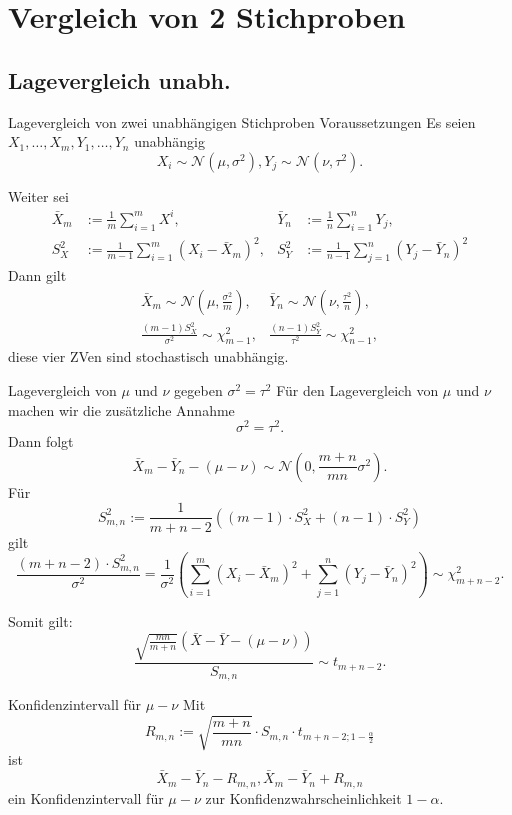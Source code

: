 \section{Vergleich von 2 Stichproben}

\subsection{Lagevergleich unabh.}

\begin{karte}{Lagevergleich von zwei unabhängigen Stichproben Voraussetzungen}
Es seien \( X_1, \ldots, X_m, Y_1, \ldots, Y_n \) unabhängig
\[ X_i \sim \mathcal{N}(\mu, \sigma^2), Y_j \sim \mathcal{N}(\nu, \tau^2). \]

Weiter sei 
\begin{align*}
\bar{X}_m &:= \frac{1}{m} \sum_{i=1}^m X^i, &\bar{Y}_n &:= \frac{1}{n} \sum_{i=1}^n Y_j, \\
S_X^2 &:= \frac{1}{m-1} \sum_{i=1}^m (X_i - \bar{X}_m)^2, &S_Y^2 &:= \frac{1}{n-1} \sum_{j=1}^n (Y_j - \bar{Y}_n)^2
\end{align*}
Dann gilt 
\begin{align*}
    \bar{X}_m \sim \mathcal{N}(\mu, \frac{\sigma^2}{m}), &\bar{Y}_n \sim \mathcal{N}(\nu, \frac{\tau^2}{n}), \\
    \frac{(m-1)S_X^2}{\sigma^2} \sim \chi_{m-1}^2, & \frac{(n-1)S_Y^2}{\tau^2} \sim \chi_{n-1}^2,
\end{align*}
diese vier ZVen sind stochastisch unabhängig.
\end{karte}

\begin{karte}{Lagevergleich von \(\mu\) und \(\nu\) gegeben \(\sigma^2 = \tau^2\)}
Für den Lagevergleich von \( \mu \) und \(\nu\) machen wir die zusätzliche Annahme 
\[ \sigma^2 = \tau^2. \]
Dann folgt 
\[ \bar{X}_m - \bar{Y}_n - (\mu - \nu) \sim \mathcal{N}(0, \frac{m+n}{mn} \sigma^2). \]
Für 
\[ S_{m,n}^2 := \frac{1}{m+n-2} ((m-1)\cdot S_X^2 + (n-1) \cdot S_Y^2) \]
gilt 
\[ \frac{(m+n-2) \cdot S_{m,n}^2}{\sigma^2} = \frac{1}{\sigma^2} \left( \sum_{i=1}^m (X_i - \bar{X}_m)^2 + \sum_{j=1}^n (Y_j - \bar{Y}_n)^2 \right) \sim \chi_{m+n-2}^2. \]

Somit gilt: 
\[ \frac{ \sqrt{ \frac{mn}{m+n} } (\bar{X} - \bar{Y} - (\mu - \nu)) }{S_{m,n}} \sim t_{m+n-2}. \]
\end{karte}

\begin{karte}{Konfidenzintervall für \( \mu - \nu \)}
Mit 
\[ R_{m,n} := \sqrt{\frac{m+n}{mn}} \cdot S_{m,n} \cdot t_{m+n-2; 1-\frac{\alpha}{2}} \]
ist 
\[ \bar{X}_m - \bar{Y}_n - R_{m,n}, \bar{X}_m - \bar{Y}_n + R_{m,n} \]
ein Konfidenzintervall für \(\mu - \nu\) zur Konfidenzwahrscheinlichkeit \(1-\alpha\).
\end{karte}


